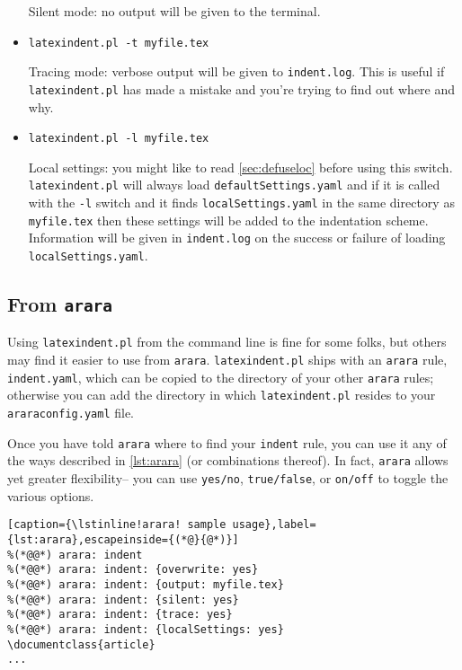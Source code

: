 \begin{itemize}[labelsep=.5cm]
	Silent mode: no output will be given to the terminal.
	\item[\verbitem{-t}] \lstinline!latexindent.pl -t myfile.tex!
													 		 		 		 		 					
	Tracing mode: verbose output will be given to \lstinline!indent.log!. This 
	is useful if \lstinline!latexindent.pl! has made a mistake and you're
	trying to find out where and why.
	\item[\verbitem{-l}] \lstinline!latexindent.pl -l myfile.tex!
													 		 		 		 		 					
	\label{page:localswitch}
	Local settings: you might like to read \cref{sec:defuseloc} before 
	using this switch. \lstinline!latexindent.pl! will always load \lstinline!defaultSettings.yaml!
	and if it is called with the \lstinline!-l! switch and it finds \lstinline!localSettings.yaml! 
	in the same directory as \lstinline!myfile.tex! then these settings will be 
	added to the indentation scheme. Information will be given in \lstinline!indent.log! on 
	the success or failure of loading \lstinline!localSettings.yaml!.
\end{itemize}
\subsection{From \lstinline!arara!}
Using \lstinline!latexindent.pl! from the command line is fine for some folks, but
others may find it easier to use from \lstinline!arara!. \lstinline!latexindent.pl!
ships with an \lstinline!arara! rule, \lstinline!indent.yaml!, which can be copied 
to the directory of
your other \lstinline!arara! rules; otherwise  you can add the directory in which \lstinline!latexindent.pl!
resides to your \lstinline!araraconfig.yaml! file.
 	 	 	 	 	
Once you have told \lstinline!arara! where to find your \lstinline!indent! rule, 
you can use it any of the ways described in \cref{lst:arara} (or combinations thereof). 
In fact, \lstinline!arara! allows yet greater flexibility-- you can use \lstinline!yes/no!, \lstinline!true/false!, or \lstinline!on/off! to toggle the various options.
 	 	 	 	 	
\begin{lstlisting}[caption={\lstinline!arara! sample usage},label={lst:arara},escapeinside={(*@}{@*)}]
%(*@@*) arara: indent
%(*@@*) arara: indent: {overwrite: yes}
%(*@@*) arara: indent: {output: myfile.tex}
%(*@@*) arara: indent: {silent: yes}
%(*@@*) arara: indent: {trace: yes}
%(*@@*) arara: indent: {localSettings: yes}
\documentclass{article}
...
\end{lstlisting}
 	 	 	 	 	
